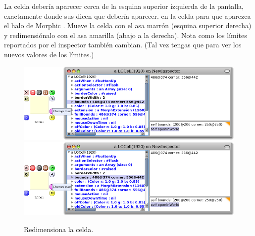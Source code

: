 \documentclass[a4paper,10pt,twoside]{book}
\begin{document}

La celda debería aparecer cerca de la esquina superior izquierda de la pantalla, exactamente donde sus  dicen que debería aparecer. 
\metaclick en la celda para que aparezca el halo de Morphic . %
Mueve la celda con el asa marrón (esquina superior derecha) y redimensiónalo con el asa amarilla (abajo a la derecha).
Nota como los límites reportados por el inspector también cambian. 
(Tal vez tengas que \actclick{}  para ver los nuevos valores de los límites.)



\begin{figure}[htbp]
\centering
\ifluluelse
	{\includegraphics[width=\textwidth]{LOCellResize} }
	{\includegraphics[scale=0.7]{LOCellResize} }
\caption{Redimensiona la celda.}
\end{figure}
\end{document}
